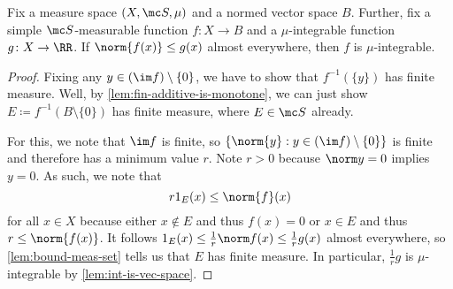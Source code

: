 \documentclass[../notes.tex]{subfiles}
\begin{document}
\begin{corollary}
	Fix a measure space $(X,\mc S,\mu)$ and a normed vector space $B$. Further, fix a simple $\mc S$-measurable function $f\colon X\to B$ and a $\mu$-integrable function $g\colon X\to\RR$. If $\norm{f(x)}\le g(x)$ almost everywhere, then $f$ is $\mu$-integrable.
\end{corollary}
\begin{proof}
	Fixing any $y\in(\im f)\setminus\{0\}$, we have to show that $f^{-1}(\{y\})$ has finite measure. Well, by \autoref{lem:fin-additive-is-monotone}, we can just show $E\coloneqq f^{-1}(B\setminus\{0\})$ has finite measure, where $E\in\mc S$ already.

	For this, we note that $\im f$ is finite, so $\{\norm{y}:y\in(\im f)\setminus\{0\}\}$ is finite and therefore has a minimum value $r$. Note $r>0$ because $\norm y=0$ implies $y=0$. As such, we note that
	\[r1_E(x)\le\norm{f}(x)\]
	for all $x\in X$ because either $x\notin E$ and thus $f(x)=0$ or $x\in E$ and thus $r\le\norm{f(x)}$. It follows $1_E(x)\le\frac1r\norm f(x)\le\frac1rg(x)$ almost everywhere, so \autoref{lem:bound-meas-set} tells us that $E$ has finite measure. In particular, $\frac 1rg$ is $\mu$-integrable by \autoref{lem:int-is-vec-space}. 
\end{proof}
\end{document}
